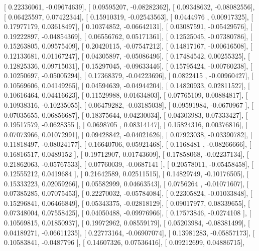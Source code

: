 \documentclass{article}
\begin{document}
       [ 0.22336061, -0.09674639],
       [ 0.09595207, -0.08282362],
       [ 0.09348632, -0.08082556],
       [ 0.06425597,  0.07422344],
       [ 0.15910319, -0.02543563],
       [ 0.0444976 ,  0.00917325],
       [ 0.17977179,  0.03618497],
       [ 0.10374852, -0.06642131],
       [ 0.03087591, -0.05429576],
       [ 0.19222897, -0.04854369],
       [ 0.06556762,  0.05171361],
       [ 0.12525045, -0.07380786],
       [ 0.15263805,  0.09575409],
       [ 0.20420115, -0.07547212],
       [ 0.14817167, -0.00616508],
       [ 0.12133681,  0.01167247],
       [ 0.04305897, -0.05086496],
       [ 0.17484542,  0.00255325],
       [ 0.12825336,  0.09715031],
       [ 0.15297045, -0.09633446],
       [ 0.15795424, -0.00760238],
       [ 0.10250697, -0.05005294],
       [ 0.17368379, -0.04223696],
       [ 0.0822415 , -0.00960427],
       [ 0.10569606,  0.04149265],
       [ 0.04594639, -0.04944204],
       [ 0.14820933,  0.02811527],
       [ 0.10616464,  0.04416623],
       [ 0.11529988,  0.01634803],
       [ 0.07765109,  0.00884817],
       [ 0.10938316, -0.10235055],
       [ 0.06479282, -0.03185038],
       [ 0.09591984, -0.0670967 ],
       [ 0.07035655,  0.06856687],
       [ 0.18375644,  0.04230034],
       [ 0.04303983,  0.07333427],
       [ 0.19517579, -0.0628355 ],
       [ 0.0698705 ,  0.08314147],
       [ 0.15824316,  0.00376816],
       [ 0.07073966,  0.01072991],
       [ 0.09428842, -0.04021626],
       [ 0.07923038, -0.03390782],
       [ 0.11818497, -0.08024177],
       [ 0.16640706,  0.05921468],
       [ 0.1168481 , -0.08266666],
       [ 0.16816517,  0.0489152 ],
       [ 0.19712907,  0.01743609],
       [ 0.17858068, -0.02237134],
       [ 0.21862063, -0.05767533],
       [ 0.07760039, -0.0687141 ],
       [ 0.20578011, -0.05458458],
       [ 0.12555212,  0.0419684 ],
       [ 0.21642589,  0.02511515],
       [ 0.14829749, -0.10176505],
       [ 0.15333223,  0.02059266],
       [ 0.05582999,  0.04663543],
       [ 0.0756264 , -0.01071607],
       [ 0.07385285,  0.07075453],
       [ 0.22270032, -0.05784084],
       [ 0.22305824, -0.01033848],
       [ 0.15296841,  0.06466849],
       [ 0.05343375, -0.02818129],
       [ 0.09017977,  0.08339655],
       [ 0.07348004,  0.07558425],
       [ 0.04050488, -0.09976966],
       [ 0.17573846, -0.0274108 ],
       [ 0.10569815,  0.01850937],
       [ 0.19972962,  0.08559179],
       [ 0.05203984, -0.08381499],
       [ 0.04189271, -0.06611235],
       [ 0.22773164, -0.06907074],
       [ 0.13981283, -0.05857173],
       [ 0.10583841, -0.0487796 ],
       [ 0.14607326,  0.07536416],
       [ 0.09212699,  0.04886715],
\end{document}

